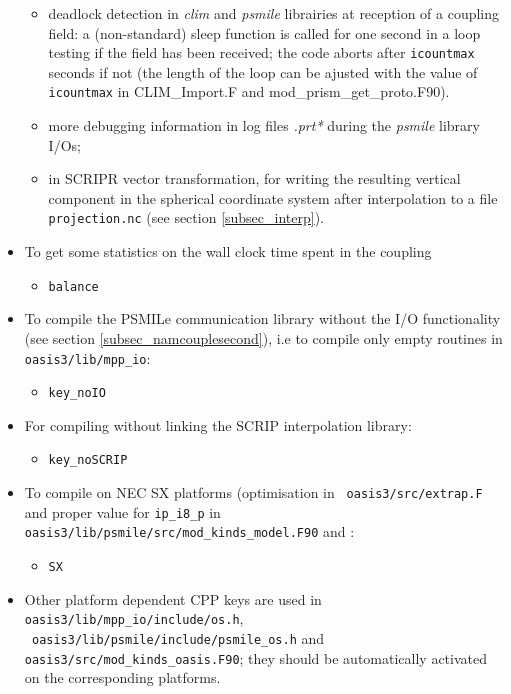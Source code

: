 \begin{itemize}
\begin{itemize}
  \item deadlock detection in {\it clim} and {\it psmile} librairies
    at reception of a coupling field: a (non-standard) sleep function
    is called for one second in a loop testing if the field has been
    received; the code aborts after {\tt icountmax} seconds if not (the length of
    the loop can be ajusted with the value of {\tt icountmax} in
    CLIM\_Import.F and mod\_prism\_get\_proto.F90).
  \item more debugging information in log files {\it *.prt*} during
    the {\it psmile} library I/Os;
  \item in SCRIPR vector transformation, for writing the resulting
    vertical component in the spherical coordinate system after
    interpolation to a file {\tt projection.nc} (see section
    \ref{subsec_interp}).
  \end{itemize}

\item To get some statistics on the wall clock time spent in the coupling
  \begin{itemize}
  \item{\tt balance}
  \end{itemize}

\item To compile the PSMILe communication library without the I/O
  functionality (see section \ref{subsec_namcouplesecond}), i.e to
  compile only empty routines in {\tt oasis3/lib/mpp\_io}:
  \begin{itemize}
  \item{\tt key\_noIO}
  \end{itemize}

\item For compiling without linking the SCRIP interpolation library:
  \begin{itemize}
  \item {\tt key\_noSCRIP}
  \end{itemize}

\item To compile on NEC SX platforms (optimisation in {\tt
    oasis3/src/extrap.F} and proper value for {\tt ip\_i8\_p} in {\tt
    oasis3/lib/psmile/src/mod\_kinds\_model.F90} and :
  \begin{itemize}
  \item {\tt SX}
  \end{itemize}

\item Other platform dependent CPP keys are used in {\tt
    oasis3/lib/mpp\_io/include/os.h},\\ {\tt
    oasis3/lib/psmile/include/psmile\_os.h} and {\tt
    oasis3/src/mod\_kinds\_oasis.F90}; they should be automatically
  activated on the corresponding platforms.


\end{itemize}

